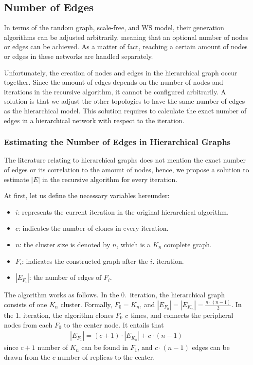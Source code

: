 \subsection{Number of Edges}

In terms of the random graph, scale-free, and WS model, their generation algorithms can be adjusted arbitrarily, meaning that an optional number of nodes or edges can be achieved. As a matter of fact, reaching a certain amount of nodes or edges in these networks are handled separately.

Unfortunately, the creation of nodes and edges in the hierarchical graph occur together. Since the amount of edges depends on the number of nodes and iterations in the recursive algorithm, it cannot be configured arbitrarily. A solution is that we adjust the other topologies to have the same number of edges as the hierarchical model. This solution requires to calculate the exact number of edges in a hierarchical network with respect to the iteration.

\subsubsection{Estimating the Number of Edges in Hierarchical Graphs}

The literature relating to hierarchical graphs does not mention the exact number of edges or its correlation to the amount of nodes, hence, we propose a solution to estimate $|E|$ in the recursive algorithm for every iteration.

At first, let us define the necessary variables hereunder:
\begin{itemize}
	\item{$i$}: represents the current iteration in the original hierarchical algorithm.
	\item{$c$}: indicates the number of clones in every iteration.
	\item{$n$}: the cluster size is denoted by $n$, which is a $K_n$ complete graph.
	\item{$F_i$}: indicates the constructed graph after the $i.$ iteration. %
	\item{$|E_{F_i}|$}: the number of edges of $F_i$.
\end{itemize}

The algorithm works as follows. In the 0.~iteration, the hierarchical graph consists of one $K_n$ cluster. Formally, $F_0 = K_n$, and $|E_{F_0}| = |E_{K_n}| = \frac{n \cdot (n-1)}{2}$. In the 1. iteration, the algorithm clones $F_0$ $c$ times, and connects the peripheral nodes from each $F_0$ to the center node. It entails that 
\begin{align}\label{eq:f1_version1}
	|E_{F_1}| = (c+1) \cdot |E_{K_n}| + c \cdot (n - 1)	
\end{align}
since $c+1$ number of $K_n$ can be found in $F_1$, and $c \cdot (n - 1)$ edges can be drawn from the $c$ number of replicas to the center.

